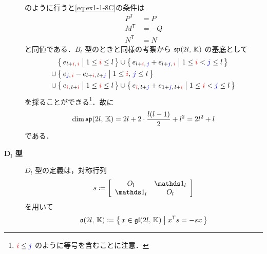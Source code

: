 \documentclass{ltjsarticle}
\theoremstyle{mystyle} %
\numberwithin{equation}{section}
\begin{document}
\begin{description}
\begin{align}
    \end{align}
    のように行うと\eqref{eq:ex1-1-8C}の条件は
    \begin{align}
        P^{\mathsf{T}} &= P  \\
        M^{\mathsf{T}} &= -Q \\
        N^{\mathsf{T}} &= N
    \end{align}
    と同値である．$B_l$ 型のときと同様の考察から $\mathfrak{sp} (2l,\, \mathbb{K})$ の基底として
    \begin{align}
        &\bigl\{\, e_{l + \textcolor{red}{i},\, \textcolor{red}{i}} \bigm| 1 \le \textcolor{red}{i} \le l \,\bigr\} \cup \bigl\{\, e_{l + \textcolor{red}{i},\, \textcolor{blue}{j}} + e_{l + \textcolor{blue}{j},\, \textcolor{red}{i}} \bigm| 1 \le \textcolor{red}{i} < \textcolor{blue}{j} \le l \,\bigr\} \\
        \cup\, &\bigl\{\, e_{\textcolor{blue}{j},\, \textcolor{red}{i}} - e_{l + \textcolor{red}{i},\, l + \textcolor{blue}{j}} \bigm| 1 \le \textcolor{red}{i},\, \textcolor{blue}{j} \le l \,\bigr\}  \\
        \cup\, &\bigl\{\, e_{\textcolor{red}{i},\, l + \textcolor{red}{i}} \bigm| 1 \le \textcolor{red}{i} \le l \,\bigr\} \cup \bigl\{\, e_{\textcolor{red}{i},\, l + \textcolor{blue}{j}} + e_{1 + \textcolor{blue}{j},\, l + \textcolor{red}{i}} \bigm| 1 \le \textcolor{red}{i} < \textcolor{blue}{j} \le l \,\bigr\} 
    \end{align}
    を採ることができる\footnote{$\textcolor{red}{i} \le \textcolor{blue}{j}$ のように等号を含むことに注意．}．故に
    \begin{align}
        \dim \mathfrak{sp} (2l,\, \mathbb{K}) = 2l + 2 \cdot \frac{l (l-1)}{2} + l^2 = 2l^2 + l
    \end{align}
    である．
    \item[\textbf{$\bm{D_l}$ 型}] $D_l$ 型の定義は，対称行列
    \begin{align}
        s \coloneqq 
        \left[
            \begin{array}{cc}
                O_l &\unity_l \\ 
                \unity_l &O_l
            \end{array}
        \right]
    \end{align}
    を用いて
    \begin{align}
        \label{eq:ex1-1-8D}
        \mathfrak{o} (2l,\, \mathbb{K}) \coloneqq \bigl\{\, x \in \mathfrak{gl}(2l,\, \mathbb{K}) \bigm| x^{\mathsf{T}}s = -sx  \,\bigr\} 
    \end{align}

\end{description}
\end{document}
